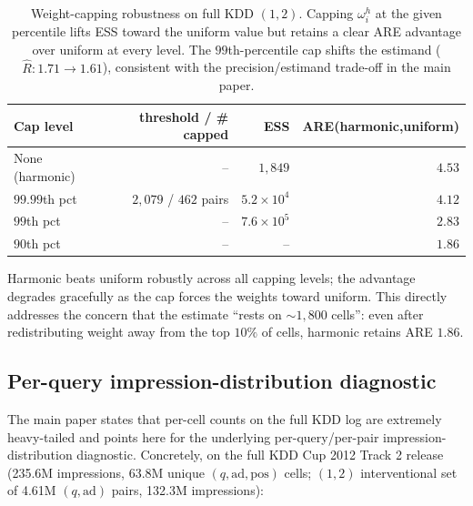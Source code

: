 \documentclass[11pt]{article}
\begin{document}
\begin{table}[h]
\centering
\caption{Weight-capping robustness on full KDD $(1,2)$. Capping
$\omega_i^h$ at the given percentile lifts ESS toward the uniform value
but retains a clear ARE advantage over uniform at every level. The
$99$th-percentile cap shifts the estimand ($\hat R:1.71\to1.61$),
consistent with the precision/estimand trade-off in the main paper.}
\label{tab:cap}
\begin{tabular}{lrrr}
\toprule
Cap level & threshold / \# capped & ESS & ARE(harmonic,uniform) \\
\midrule
None (harmonic)      & --                       & $1{,}849$          & $4.53$ \\
$99.99$th pct        & $2{,}079$ / $462$ pairs   & $5.2\times10^{4}$  & $4.12$ \\
$99$th pct           & --                       & $7.6\times10^{5}$  & $2.83$ \\
$90$th pct           & --                       & --                 & $1.86$ \\
\bottomrule
\end{tabular}
\end{table}

Harmonic beats uniform robustly across all capping levels; the advantage
degrades gracefully as the cap forces the weights toward uniform. This
directly addresses the concern that the estimate ``rests on
$\sim\!1{,}800$ cells'': even after redistributing weight away from the
top $10\%$ of cells, harmonic retains ARE $1.86$.

\subsection{Per-query impression-distribution diagnostic}
\label{sec:perquery}

The main paper states that per-cell counts on the full KDD log are
extremely heavy-tailed and points here for the underlying
per-query/per-pair impression-distribution diagnostic. Concretely, on
the full KDD Cup 2012 Track 2 release (235.6M impressions, 63.8M unique
$(q,\mathrm{ad},\mathrm{pos})$ cells; $(1,2)$ interventional set of
4.61M $(q,\mathrm{ad})$ pairs, 132.3M impressions):
\end{document}
